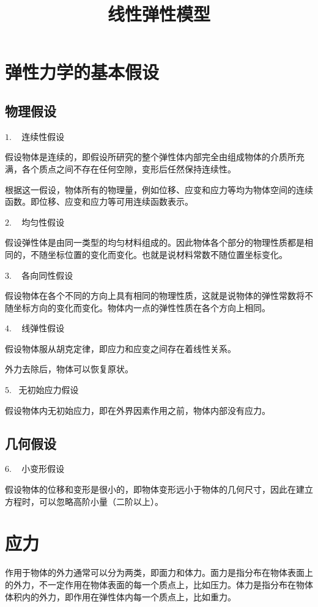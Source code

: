 \documentclass[12pt,a4paper]{article}
\title{线性弹性模型}
\date{\chntoday}
\begin{document}
\maketitle

\section{弹性力学的基本假设}
\subsection{物理假设}

$1$. ~ 连续性假设

假设物体是连续的，即假设所研究的整个弹性体内部完全由组成物体的介质所充满，各个质点之间不存在任何空隙，变形后任然保持连续性。

根据这一假设，物体所有的物理量，例如位移、应变和应力等均为物体空间的连续函数。即位移、应变和应力等可用连续函数表示。

$2$. ~ 均匀性假设

假设弹性体是由同一类型的均匀材料组成的。因此物体各个部分的物理性质都是相同的，不随坐标位置的变化而变化。也就是说材料常数不随位置坐标变化。

$3$. ~ 各向同性假设

假设物体在各个不同的方向上具有相同的物理性质，这就是说物体的弹性常数将不随坐标方向的变化而变化。物体内一点的弹性性质在各个方向上相同。

$4$. ~ 线弹性假设

假设物体服从胡克定律，即应力和应变之间存在着线性关系。

外力去除后，物体可以恢复原状。

$5$.~ 无初始应力假设

假设物体内无初始应力，即在外界因素作用之前，物体内部没有应力。

\subsection{几何假设}

$6$. ~ 小变形假设

假设物体的位移和变形是很小的，即物体变形远小于物体的几何尺寸，因此在建立方程时，可以忽略高阶小量（二阶以上）。

\section{应力}

作用于物体的外力通常可以分为两类，即面力和体力。面力是指分布在物体表面上的外力，不一定作用在物体表面的每一个质点上，比如压力。体力是指分布在物体体积内的外力，即作用在弹性体内每一个质点上，比如重力。
\end{document}
